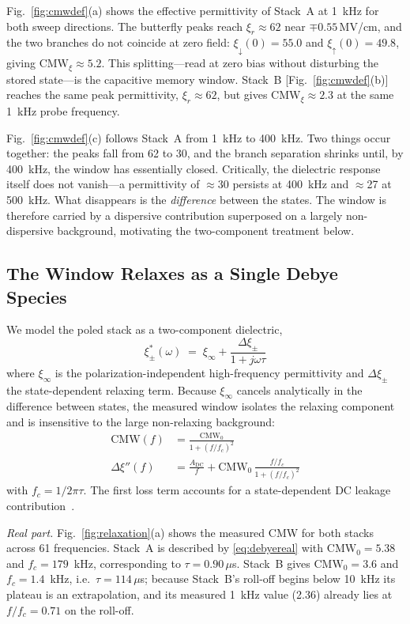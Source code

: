 \documentclass[journal]{IEEEtran}
\newcommand{\xir}{\xi_{r}}
\newcommand{\CMW}{\mathrm{CMW}}
\newcommand{\fc}{f_{c}}
\newcommand{\MVcm}{\,MV/cm}
\begin{document}
Fig.~\ref{fig:cmwdef}(a) shows the effective permittivity of Stack~A at
1~kHz for both sweep directions. The butterfly peaks reach
$\xir \approx 62$ near $\mp0.55$\MVcm{}, and the two branches do not coincide
at zero field: $\xi_\downarrow(0) = 55.0$ and $\xi_\uparrow(0) = 49.8$,
giving $\CMW_\xi \approx 5.2$. This splitting---read at zero bias without
disturbing the stored state---is the capacitive memory window. Stack~B
[Fig.~\ref{fig:cmwdef}(b)] reaches the same peak permittivity,
$\xir \approx 62$, but gives $\CMW_\xi \approx 2.3$ at the same 1~kHz probe
frequency.

Fig.~\ref{fig:cmwdef}(c) follows Stack~A from 1~kHz to 400~kHz. Two things
occur together: the peaks fall from 62 to 30, and the branch separation
shrinks until, by 400~kHz, the window has essentially closed. Critically, the
dielectric response itself does not vanish---a permittivity of $\approx$30
persists at 400~kHz and $\approx$27 at 500~kHz. What disappears is the
\emph{difference} between the states. The window is therefore carried by a
dispersive contribution superposed on a largely non-dispersive background,
motivating the two-component treatment below.

\subsection{The Window Relaxes as a Single Debye Species}
\label{sec:debye}
We model the poled stack as a two-component dielectric,
\begin{equation}
\xi^{*}_{\pm}(\omega) \;=\; \xi_\infty + \frac{\Delta\xi_\pm}{1+j\omega\tau}
\label{eq:twocomp}
\end{equation}
where $\xi_\infty$ is the polarization-independent high-frequency
permittivity and $\Delta\xi_\pm$ the state-dependent relaxing term. Because
$\xi_\infty$ cancels analytically in the difference between states, the
measured window isolates the relaxing component and is insensitive to the
large non-relaxing background:
\begin{align}
\CMW(f) &= \frac{\CMW_0}{1+(f/\fc)^2} \label{eq:debyereal}\\
\Delta\xi''(f) &= \frac{A_{\mathrm{DC}}}{f}
   + \CMW_0\,\frac{f/\fc}{1+(f/\fc)^2} \label{eq:debyeimag}
\end{align}
with $\fc = 1/2\pi\tau$. The first loss term accounts for a state-dependent
DC leakage contribution~\cite{nicollian1982,schroder2006}.

\textit{Real part.} Fig.~\ref{fig:relaxation}(a) shows the measured CMW for
both stacks across 61 frequencies. Stack~A is described by
\eqref{eq:debyereal} with $\CMW_0 = 5.38$ and $\fc = 179$~kHz, corresponding
to $\tau = 0.90\,\mu$s. Stack~B gives $\CMW_0 = 3.6$ and $\fc = 1.4$~kHz,
i.e.\ $\tau = 114\,\mu$s; because Stack~B's roll-off begins below 10~kHz its
plateau is an extrapolation, and its measured 1~kHz value (2.36) already lies
at $f/\fc = 0.71$ on the roll-off.
\end{document}
